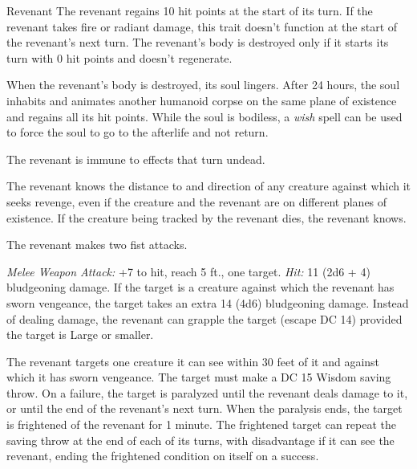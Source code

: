 \documentclass[10pt,a4paper,twoside,fancy,bg=print,twocolumn,openany,nodeprecatedcode]{dndbook}
\begin{document}
\begin{DndMonster}[float=t]{Revenant}
\DndMonsterBasics[
armor-class = {13 (\textit{leather armor})},
hit-points = {\DndDice{16d8 + 64}},
speed = {30 ft.}
]
\DndMonsterAbilityScores[
 str = 18,
 dex = 14,
 con = 18,
 int = 13,
 wis = 16,
 cha = 18
]
\DndMonsterDetails[
saving-throws = {Str +7, Con +7, Wis +6, Cha +7},
damage-resistances = {necrotic, psychic},
damage-immunities = {poison},
senses = {darkvision 60 ft., passive perception 13},
languages = {the languages it knew in life},
challenge = 5,
]
The revenant regains 10 hit points at the start of its turn. If the revenant takes fire or radiant damage, this trait doesn't function at the start of the revenant's next turn. The revenant's body is destroyed only if it starts its turn with 0 hit points and doesn't regenerate.

When the revenant's body is destroyed, its soul lingers. After 24 hours, the soul inhabits and animates another humanoid corpse on the same plane of existence and regains all its hit points. While the soul is bodiless, a \textit{wish} spell can be used to force the soul to go to the afterlife and not return.

The revenant is immune to effects that turn undead.

The revenant knows the distance to and direction of any creature against which it seeks revenge, even if the creature and the revenant are on different planes of existence. If the creature being tracked by the revenant dies, the revenant knows.

The revenant makes two fist attacks.

\textsl{Melee Weapon Attack:} +7 to hit, reach 5 ft., one target. \textsl{Hit:} 11 (2d6 + 4) bludgeoning damage. If the target is a creature against which the revenant has sworn vengeance, the target takes an extra 14 (4d6) bludgeoning damage. Instead of dealing damage, the revenant can grapple the target (escape DC 14) provided the target is Large or smaller.

The revenant targets one creature it can see within 30 feet of it and against which it has sworn vengeance. The target must make a DC 15 Wisdom saving throw. On a failure, the target is paralyzed until the revenant deals damage to it, or until the end of the revenant's next turn. When the paralysis ends, the target is frightened of the revenant for 1 minute. The frightened target can repeat the saving throw at the end of each of its turns, with disadvantage if it can see the revenant, ending the frightened condition on itself on a success.

\end{DndMonster}
\end{document}
